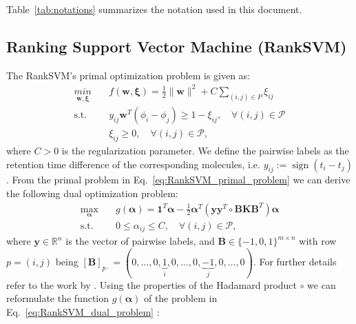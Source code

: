 \documentclass[10p]{article}
\newcommand{\st}{\text{s.t.}}
\newcommand{\defi}{:=}
\newcommand{\balpha}{\boldsymbol{\alpha}}
\newcommand{\bones}{\mathbf{1}}
\newcommand{\numexp}{n}
\newcommand{\numpair}{m}
\newcommand{\Pset}{\mathcal{P}}
\DeclareMathOperator{\sign}{sign}
\begin{document}
Table~\ref{tab:notations} summarizes the notation used in this document.

\subsection{Ranking Support Vector Machine (RankSVM)}

The RankSVM's primal optimization problem is given as: 
\begin{equation}
\begin{split}
    \underset{\mathbf{w},\boldsymbol{\xi}}{min} 
        &\quad f(\mathbf{w},\boldsymbol{\xi}) = \frac{1}{2}\|\mathbf{w}\|^2 + C\sum_{(i,j)\in P}\xi_{ij} \\
    \st &\quad y_{ij}\mathbf{w}^T(\phi_i-\phi_j)\geq 1-\xi_{ij},\quad\forall(i,j)\in\Pset\\
        &\quad \xi_{ij} \geq 0,\quad\forall(i,j)\in\Pset,
    \label{eq:RankSVM_primal_problem}
\end{split}
\end{equation}
where $C>0$ is the regularization parameter. We define the pairwise labels as the retention time difference of the corresponding molecules, i.e. $y_{ij}\defi\sign(t_i-t_j)$. From the primal problem in Eq.~\eqref{eq:RankSVM_primal_problem} we can derive the following dual optimization problem:
\begin{equation}
\begin{split}
    \underset{\balpha}{\max} 
        &\quad g(\balpha) = \bones^T\balpha - \frac{1}{2} \balpha^T\left(\mathbf{y}\mathbf{y}^T\circ\mathbf{B}\mathbf{K}\mathbf{B}^T\right)\balpha \\ 
    \st &\quad 0\leq\alpha_{ij}\leq C,\quad\forall (i,j)\in \Pset,
    \label{eq:RankSVM_dual_problem}
\end{split}
\end{equation}
where $\mathbf{y}\in\mathbb{R}^\numexp$ is the vector of pairwise labels, and $\mathbf{B}\in\{-1,0,1\}^{\numpair\times\numexp}$ with row $p=(i,j)$ being $[\mathbf{B}]_{p\cdot}=(0,\ldots,0,\underbrace{1}_{i},0,\ldots,0,\underbrace{-1}_{j},0,\ldots,0)$. For further details refer to the work by \cite{Kuo2014}. Using the properties of the Hadamard product $\circ$ we can reformulate the function $g(\balpha)$ of the problem in Eq.~\eqref{eq:RankSVM_dual_problem} \parencite{Styan1973}:
\end{document}

